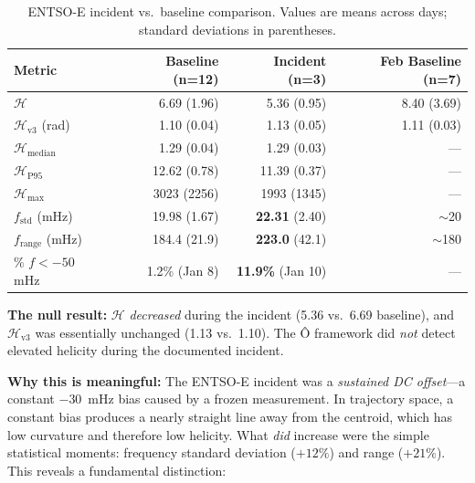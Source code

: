 \documentclass[11pt,a4paper]{article}
\begin{document}
\begin{table}[H]
\centering
\caption{ENTSO-E incident vs.\ baseline comparison. Values are means across days; standard deviations in parentheses.}
\label{tab:incident}
\begin{tabular}{lrrr}
\toprule
\textbf{Metric} & \textbf{Baseline (n=12)} & \textbf{Incident (n=3)} & \textbf{Feb Baseline (n=7)} \\
\midrule
$\mathcal{H}$ & 6.69 (1.96) & 5.36 (0.95) & 8.40 (3.69) \\
$\mathcal{H}_{\text{v3}}$ (rad) & 1.10 (0.04) & 1.13 (0.05) & 1.11 (0.03) \\
$\mathcal{H}_{\text{median}}$ & 1.29 (0.04) & 1.29 (0.03) & — \\
$\mathcal{H}_{\text{P95}}$ & 12.62 (0.78) & 11.39 (0.37) & — \\
$\mathcal{H}_{\text{max}}$ & 3023 (2256) & 1993 (1345) & — \\
$f_{\text{std}}$ (mHz) & 19.98 (1.67) & \textbf{22.31} (2.40) & $\sim$20 \\
$f_{\text{range}}$ (mHz) & 184.4 (21.9) & \textbf{223.0} (42.1) & $\sim$180 \\
\% $f < -50$ mHz & 1.2\% (Jan 8) & \textbf{11.9\%} (Jan 10) & — \\
\bottomrule
\end{tabular}
\end{table}

\textbf{The null result:} $\mathcal{H}$ \emph{decreased} during the incident (5.36 vs.\ 6.69 baseline), and $\mathcal{H}_{\text{v3}}$ was essentially unchanged (1.13 vs.\ 1.10). The Ô framework did \emph{not} detect elevated helicity during the documented incident.

\textbf{Why this is meaningful:} The ENTSO-E incident was a \emph{sustained DC offset}—a constant $-30$~mHz bias caused by a frozen measurement. In trajectory space, a constant bias produces a nearly straight line away from the centroid, which has low curvature and therefore low helicity. What \emph{did} increase were the simple statistical moments: frequency standard deviation ($+12\%$) and range ($+21\%$). This reveals a fundamental distinction:

\begin{center}
\end{center}
\end{document}
